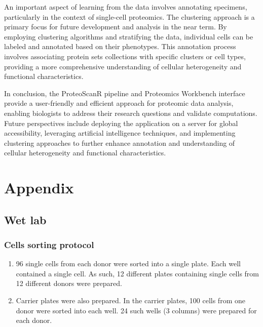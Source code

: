 \documentclass[
  11pt,
]{article}
\begin{document}
An important aspect of learning from the data involves annotating
specimens, particularly in the context of single-cell proteomics. The
clustering approach is a primary focus for future development and
analysis in the near term. By employing clustering algorithms and
stratifying the data, individual cells can be labeled and annotated
based on their phenotypes. This annotation process involves associating
protein sets collections with specific clusters or cell types, providing
a more comprehensive understanding of cellular heterogeneity and
functional characteristics.

In conclusion, the ProteoScanR pipeline and Proteomics Workbench
interface provide a user-friendly and efficient approach for proteomic
data analysis, enabling biologists to address their research questions
and validate computations. Future perspectives include deploying the
application on a server for global accessibility, leveraging artificial
intelligence techniques, and implementing clustering approaches to
further enhance annotation and understanding of cellular heterogeneity
and functional characteristics.

\newpage



\newpage

\hypertarget{appendix}{%
\section{Appendix}\label{appendix}}

\hypertarget{wet-lab}{%
\subsection{Wet lab}\label{wet-lab}}

\hypertarget{cells-sorting-protocol}{%
\subsubsection{Cells sorting protocol}\label{cells-sorting-protocol}}

\begin{enumerate}
\item 96 single cells from each donor were sorted into a single plate. Each well contained a single cell. As such, 12 different plates containing single cells from 12 different donors were prepared. 
\item Carrier plates were also prepared. In the carrier plates, 100 cells from one donor were sorted into each well. 24 such wells (3 columns) were prepared for each donor.
\end{enumerate}
\end{document}
